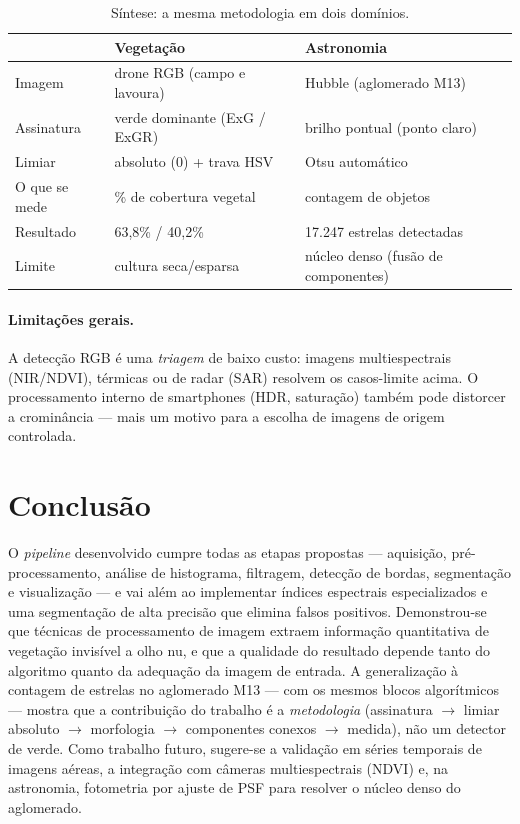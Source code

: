 \documentclass[12pt,a4paper]{article}
\begin{document}
\begin{table}[H]
\centering
\caption{Síntese: a mesma metodologia em dois domínios.}
\label{tab:sintese}
\begin{tabular}{lll}
\toprule
 & \textbf{Vegetação} & \textbf{Astronomia} \\
\midrule
Imagem        & drone RGB (campo e lavoura)    & Hubble (aglomerado M13) \\
Assinatura    & verde dominante (ExG / ExGR)   & brilho pontual (ponto claro) \\
Limiar        & absoluto (0) + trava HSV       & Otsu automático \\
O que se mede & \% de cobertura vegetal        & contagem de objetos \\
Resultado     & 63,8\% / 40,2\%               & 17.247 estrelas detectadas \\
Limite        & cultura seca/esparsa           & núcleo denso (fusão de componentes) \\
\bottomrule
\end{tabular}
\end{table}

\paragraph{Limitações gerais.} A detecção RGB é uma \emph{triagem} de baixo custo: imagens
multiespectrais (NIR/NDVI), térmicas ou de radar (SAR) resolvem os casos-limite acima. O
processamento interno de smartphones (HDR, saturação) também pode distorcer a crominância ---
mais um motivo para a escolha de imagens de origem controlada.

\section{Conclusão}

O \emph{pipeline} desenvolvido cumpre todas as etapas propostas --- aquisição,
pré-processamento, análise de histograma, filtragem, detecção de bordas, segmentação e
visualização --- e vai além ao implementar índices espectrais especializados e uma segmentação
de alta precisão que elimina falsos positivos. Demonstrou-se que técnicas de processamento de
imagem extraem informação quantitativa de vegetação invisível a olho nu, e que a qualidade do
resultado depende tanto do algoritmo quanto da adequação da imagem de entrada. A generalização à contagem de estrelas no aglomerado M13 --- com os mesmos blocos algorítmicos
--- mostra que a contribuição do trabalho é a \emph{metodologia} (assinatura $\rightarrow$
limiar absoluto $\rightarrow$ morfologia $\rightarrow$ componentes conexos $\rightarrow$ medida),
não um detector de verde. Como trabalho futuro, sugere-se a validação em séries temporais de
imagens aéreas, a integração com câmeras multiespectrais (NDVI) e, na astronomia, fotometria
por ajuste de PSF para resolver o núcleo denso do aglomerado.
\end{document}

